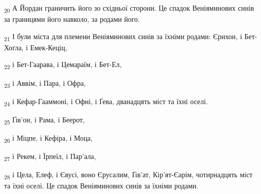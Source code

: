 \begin{tcolorbox}
\textsubscript{20} А Йордан граничить його зо східньої сторони. Це спадок Веніяминових синів за границями його навколо, за родами його.
\end{tcolorbox}
\begin{tcolorbox}
\textsubscript{21} І були міста для племени Веніяминових синів за їхніми родами: Єрихон, і Бет-Хоґла, і Емек-Кеціц,
\end{tcolorbox}
\begin{tcolorbox}
\textsubscript{22} і Бет-Гаарава, і Цемараїм, і Бет-Ел,
\end{tcolorbox}
\begin{tcolorbox}
\textsubscript{23} і Аввім, і Пара, і Офра,
\end{tcolorbox}
\begin{tcolorbox}
\textsubscript{24} і Кефар-Гааммоні, і Офні, і Ґева, дванадцять міст та їхні оселі.
\end{tcolorbox}
\begin{tcolorbox}
\textsubscript{25} Ґів'он, і Рама, і Беерот,
\end{tcolorbox}
\begin{tcolorbox}
\textsubscript{26} і Міцпе, і Кефіра, і Моца,
\end{tcolorbox}
\begin{tcolorbox}
\textsubscript{27} і Рекем, і Їрпеїл, і Пар'ала,
\end{tcolorbox}
\begin{tcolorbox}
\textsubscript{28} і Цела, Елеф, і Євусі, воно Єрусалим, Ґів'ат, Кір'ят-Єарім, чотирнадцять міст та їхні оселі. Це спадок Веніяминових синів за їхніми родами.
\end{tcolorbox}

